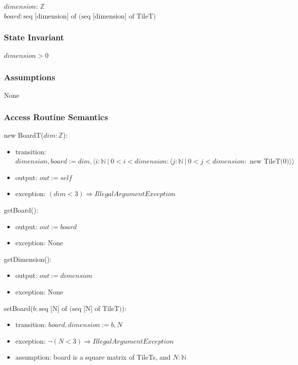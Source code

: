 \documentclass[12pt]{article}
\begin{document}
$\mathit{dimension}$: $\mathbb{Z}$\\
$\mathit{board}: \text{seq [dimension] of (seq [dimension] of TileT)}$\\

\subsubsection* {State Invariant}

$dimension > 0$

\subsubsection* {Assumptions}

None

\subsubsection* {Access Routine Semantics}

\noindent new BoardT($dim: \mathbb{Z}$):
\begin{itemize}
  \item transition: $dimension, board := dim, \langle i: \mathbb{N}\ \vert\ 0 < i < dimension: \langle j: \mathbb{N}\ \vert\ 0 < j < dimension: \text{ new TileT(0)}\rangle\rangle$
  \item output: $out := \mathit{self}$
  \item exception: $(dim < 3) \Rightarrow IllegalArgumentException$
\end{itemize}

\noindent getBoard():
\begin{itemize}
  \item output: $out := board$
  \item exception: None
\end{itemize}

\noindent getDimension():
\begin{itemize}
  \item output: $out := dimension$
  \item exception: None
\end{itemize}

\noindent setBoard($b: \text{seq [N] of (seq [N] of TileT)}$):
\begin{itemize}
  \item transition: $board, dimension := b, N$
  \item exception: $\lnot (N < 3) \Rightarrow IllegalArgumentException$
  \item assumption: board is a square matrix of TileTs, and $N: \mathbb{N}$
\end{itemize}
\end{document}
